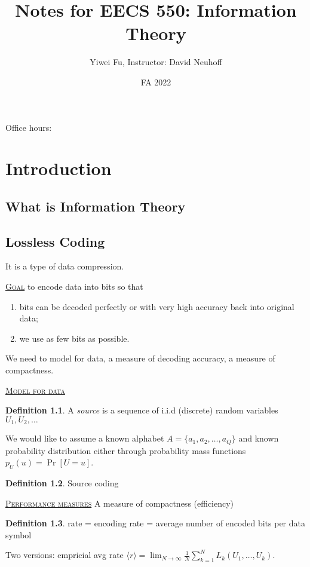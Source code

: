 \documentclass{report}
\newcommand{\fancyem}[1]{\underline{\textsc{#1}}}
\theoremstyle{definition}
\newtheorem{definition}{Definition}[section]
\theoremstyle{remark}
\numberwithin{equation}{section}
\begin{document}
\title{Notes for EECS 550: Information Theory}
\author{Yiwei Fu, Instructor: David Neuhoff}
\date{FA 2022}
\maketitle


\tableofcontents
Office hours: 

\clearpage
{}

\chapter{Introduction}
\section{What is Information Theory}

\section{Lossless Coding}
It is a type of data compression.

\fancyem{Goal} to encode data into bits so that \begin{enumerate}
  \item bits can be decoded perfectly or with very high accuracy back into original data;
  \item we use as few bits as possible.
\end{enumerate}

We need to model for data, a measure of decoding accuracy, a measure of compactness.

\fancyem{Model for data}
\begin{definition}
  A \emph{source} is a sequence of i.i.d (discrete) random variables $U_1, U_2, \ldots$
\end{definition}
We would like to assume a known alphabet $A = \{a_1, a_2, \ldots, a_Q\}$ and known probability distribution either through probability mass functions $p_U(u) = \Pr[U = u]$.

\begin{definition}
  Source coding
\end{definition}

\fancyem{Performance measures}
A measure of compactness (efficiency)

\begin{definition}
  rate = encoding rate = average number of encoded bits per data symbol
\end{definition}
  Two versions:
  empricial avg rate $\langle r \rangle = \lim_{N \to \infty} \frac{1}{N}\sum_{k=1}^N L_k(U_1, \ldots, U_k)$.
\end{document}
